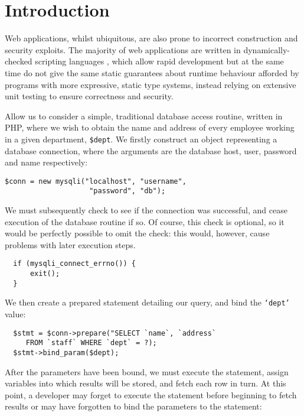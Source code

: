 \documentclass[preprint]{sigplanconf}
\begin{document}



\section{Introduction}
Web applications, whilst ubiquitous, are also prone to incorrect construction and security exploits. The majority of web applications are written in dynamically-checked scripting languages \cite{}, which allow rapid development but at the same time do not give the same static guarantees about runtime behaviour afforded by programs with more expressive, static type systems, instead relying on extensive unit testing to ensure correctness and security. 

Allow us to consider a simple, traditional database access routine, written in PHP, where we wish to obtain the name and address of every employee working in a given department, \texttt{\$dept}. We firstly construct an object representing a database connection, where the arguments are the database host, user, password and name respectively:

{\small
\begin{verbatim}
$conn = new mysqli("localhost", "username", 
                    "password", "db");
\end{verbatim}
}

We must subsequently check to see if the connection was successful, and cease execution of the database routine if so. Of course, this check is optional, so it would be perfectly possible to omit the check: this would, however, cause problems with later execution steps.

{\small
\begin{verbatim}
  if (mysqli_connect_errno()) {
      exit();
  }
\end{verbatim}
}

We then create a prepared statement detailing our query, and bind the \texttt{`dept'} value:

{\small
\begin{verbatim}
  $stmt = $conn->prepare("SELECT `name`, `address` 
     FROM `staff` WHERE `dept` = ?);
  $stmt->bind_param($dept);
\end{verbatim}
}

After the parameters have been bound, we must execute the statement, assign variables into which results will be stored, and fetch each row in turn. At this point, a developer may forget to execute the statement before beginning to fetch results or may have forgotten to bind the parameters to the statement:
\end{document}
